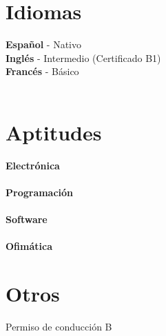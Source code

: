 \documentclass[]{cv-class}
\begin{document}
\begin{aside}
    \section{Idiomas}
    \textbf{Español} - Nativo\\
    \textbf{Inglés} - Intermedio (Certificado B1)\\
    \textbf{Francés} - Básico\\
    ~
    \section{Aptitudes}
    \textbf{Electrónica}\\
    \\
    \vspace{0.20cm}
    \textbf{Programación}\\
    \\
    \vspace{0.20cm}
    \textbf{Software}\\
    \\
    \vspace{0.20cm}
    \textbf{Ofimática}\\
    \framebox{\LaTeX}
    
    \section{Otros}
    Permiso de conducción B

\end{aside}

\vspace{0.75cm}
\end{document}

